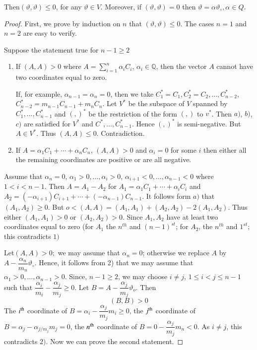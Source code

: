 Then\pageoriginale $(\vartheta,\vartheta)\leq 0$, for any $\vartheta \in
V$. Moreover, if $(\vartheta, \vartheta)=0$ then $\vartheta=\alpha
\vartheta_\circ, \alpha\in Q$.  

\begin{proof}
  First, we prove by induction on $n$ that $(\vartheta,\vartheta)\leq
  0$. The cases $n=1$ and $n=2$ are easy to verify. 

Suppose the statement true for ${n-1} \geq 2$
\begin{enumerate}[1)]
\item  If $(A,A)>0$ where $A=\sum\limits^{n}_{i=1}\alpha_i C_i$,
  $\alpha_i \in \mathbb{Q}$, then the vector $A$ cannot have two
  coordinates equal to zero.  

  If, for example, $\alpha_{n-1}=\alpha_n=0$, then we take $C^*_1=
  C_1,C^*_2= C_2,\ldots,C^*_{n-2}$, $C^*_{n-2}=m_{n-1}C_{n-1}+m_n
  C_n$. Let $V^*$ be the subspace of $V$ spanned by $C^{*}_{1}, \ldots
  , C^{*}_{n-1}$ and $(,)^{*}$ be the restriction of the form $(,)$ to
  $v^*$. Then $a)$, $b)$, $c)$ are satisfied for $V^*$ and
  $C^*,\ldots, C^*_{n-1}$. Hence $(,)^*$ is semi-negative. But $A\in
  V^*$. Thus $(A,A)\leq 0$. Contradiction.  

\item If $A=\alpha_1 C_1+\cdots+\alpha_nC_n$, $(A,A) >0$ and
  $\alpha_i=0$ for some $i$ then either all the remaining coordinates
  are positive or are all negative. 
\end{enumerate}

  Assume that $\alpha_n=0$, $\alpha_1>0,\ldots,\alpha_i >0$,
  $\alpha_{i+1}< 0,\ldots,\alpha_{n-1}<0$ where $1<i<n-1$. Then
  $A=A_1-A_2$ for $A_1=\alpha_1C_1+\cdots+\alpha_iC_i$ and $
  A_2=(-\alpha_{i+1})C_{i+1}+\cdots+(-\alpha_{n-1})C_{n-1}$. It follows
  form $a)$ that $(A_1,A_2)\geq 0$. But
  $o<(A,A)=(A_1,A_1)+(A_2,A_2)-2(A_1,A_2)$. Thus either $(A_1,A_1)>0$
  or $(A_2,A_2)>0$. Since $A_1,A_2$ have at least two coordinates
  equal to zero (for $A_1$ the $n^{th}$ and $(n-1)^{st}$; for $A_2$,
  the $n^{th}$ and $1^{st}$; this contradicts $1)$ 

Let\pageoriginale  $(A,A)>0;$ we may assume that $\alpha_n=0$;
otherwise we replace 
$A$ by $A-\dfrac{\alpha_{n}}{m_n}\vartheta_\circ$. Hence, it follows
from 2) that we may assume that
$\alpha_1>0,\ldots,\alpha_{n-1}>0$. Since, $n-1\geq 2$, we may choose
$i\neq j$, $1\leq i < j \leq n-1$ such that
$\dfrac{\alpha_i}{m_i}-\dfrac{\alpha_j}{m_j}\geq 0$. Let
$B=A-\dfrac{\alpha_j}{m_j} \vartheta_o$. Then   
$$
(B,B)>0
$$
The $i^{\rm th}$ coordinate of $B=\alpha_i-\dfrac{\alpha_j}{m_j}m_i\geq
0$, the $j^{\rm th}$ coordinate of $B=\alpha_j - \alpha_{j/m_j} m_j=0$, the
$n^{\rm th}$ coordinate of $B = 0 - \dfrac{\alpha_j}{m_j} m_n<0$. As
$i\neq j$, this contradicts $2)$. Now we can prove the second
statement.  


\end{proof}
